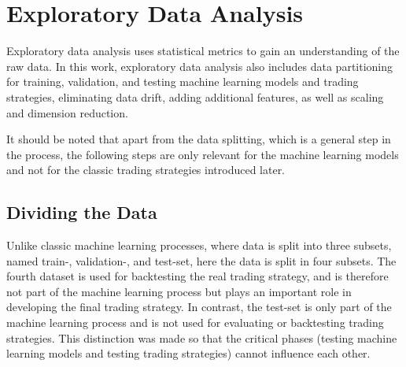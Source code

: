 \section{Exploratory Data Analysis}
\label{chap:eda}

Exploratory data analysis uses statistical metrics to gain an understanding of the raw data.
In this work, exploratory data analysis also includes data partitioning for training, validation, and testing machine learning models and trading strategies, eliminating data drift, adding additional features, as well as scaling and dimension reduction.

It should be noted that apart from the data splitting, which is a general step in the process, the following steps are only relevant for the machine learning models and not for the classic trading strategies introduced later.

\subsection{Dividing the Data}

Unlike classic machine learning processes, where data is split into three subsets, named train-, validation-, and test-set, here the data is split in four subsets.
The fourth dataset is used for backtesting the real trading strategy, and is therefore not part of the machine learning process but plays an important role in developing the final trading strategy.
In contrast, the test-set is only part of the machine learning process and is not used for evaluating or backtesting trading strategies.
This distinction was made so that the critical phases (testing machine learning models and testing trading strategies) cannot influence each other.

